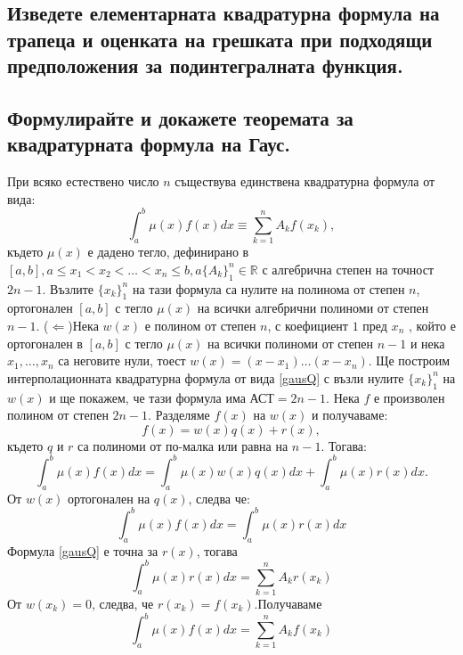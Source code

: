 \documentclass[12pt]{article}
\numberwithin{equation}{subsection}
\numberwithin{theorem}{subsection}
\numberwithin{definition}{subsection}
\numberwithin{corollary}{subsection}
\begin{document}
\subsection{Изведете елементарната квадратурна формула на трапеца и оценката на грешката при подходящи предположения за подинтегралната функция.}

\subsection{Формулирайте и докажете теоремата за квадратурната формула на Гаус.}
  \theorem При всяко естествено число $n$ съществува единствена квадратурна формула от вида:
    \begin{equation}\label{gausQ}
      \int_{a}^{b}\mu(x)f(x)dx\equiv\sum_{k=1}^{n}A_kf(x_k),
    \end{equation}
  където $\mu(x)$ е дадено тегло, дефинирано в $[a,b], a\leq x_1<x_2<\ldots<x_n\leq b, a \{A_k\}_1^n\in\mathbb R$ с алгебрична степен на точност $2n-1$. Възлите $\{x_k\}_1^n$ на тази формула са нулите на полинома от степен $n$, ортогонален $[a,b]$ с тегло $\mu(x)$ на всички алгебрични полиноми от степен $n-1$.
  \proof
  ($\Leftarrow$)Нека $w(x)$ е полином от степен $n$, с коефициент $1$ пред $x_n$ , който е ортогонален в $[a,b]$ с тегло $\mu(x)$ на всички полиноми от степен $n-1$ и нека $x_1,\ldots,x_n$ са неговите нули, тоест $w(x) = (x-x_1)\ldots(x-x_n)$. Ще построим интерполационната квадратурна формула от вида \ref{gausQ} с възли нулите $\{x_k\}_1^n$ на $w(x)$ и  ще покажем, че тази формула има АСТ$=2n-1$.
  Нека $f$ е произволен полином от степен $2n-1$. Разделяме $f(x)$ на $w(x)$ и получаваме:
  \begin{equation}
    f(x)=w(x)q(x)+r(x),
  \end{equation}
  където $q$ и $r$ са полиноми от по-малка или равна на $n-1$. Тогава:
  \begin{equation*}
    \int_{a}^{b}\mu(x)f(x)dx=\int_{a}^{b}\mu(x)w(x)q(x)dx+\int_{a}^{b}\mu(x)r(x)dx.
  \end{equation*}
  От $w(x)$ ортогонален на $q(x)$, следва че:
  \begin{equation*}
    \int_{a}^{b}\mu(x)f(x)dx=\int_{a}^{b}\mu(x)r(x)dx
  \end{equation*}
  Формула \ref{gausQ} е точна за $r(x)$, тогава
  \begin{equation*}
    \int_{a}^{b}\mu(x)r(x)dx=\sum_{k=1}^{n}A_kr(x_k)
  \end{equation*}
  От $w(x_k)=0$, следва, че $r(x_k)=f(x_k)$.Получаваме
  \begin{equation*}
    \int_{a}^{b}\mu(x)f(x)dx = \sum_{k=1}^{n}A_kf(x_k)
  \end{equation*}
\end{document}
